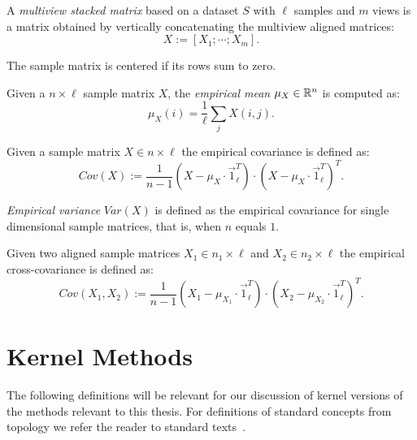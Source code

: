 \begin{definition}\label{def:notation:multiview_stacked_matrix}
A \emph{multiview stacked matrix} based on a dataset $S$ with $\ell$ samples and $m$ views is a matrix obtained by
vertically concatenating the multiview aligned matrices:
$$ X := \left[ X_1; \cdots ; X_m \right].$$
\end{definition}

\begin{definition}\label{def:notation:centered_matrix}
The sample matrix is centered if its rows sum to zero.
\end{definition}

\begin{definition}\label{def:notation:empirical_mean}
Given a $n\times\ell$ sample matrix $X$, the \emph{empirical mean} $\mu_X \in \mathbb{R}^n$ is computed as:
$$ \mu_X(i) = \frac{1}{\ell} \sum_j X(i,j).$$
\end{definition}

\begin{definition}\label{def:notation:empirical_covariance}
Given a sample matrix $X \in n \times \ell$
 the empirical covariance is defined as:
$$ Cov(X) := \frac{1}{n-1}(X - \mu_{X} \cdot \vec{1}_\ell^T)\cdot(X - \mu_{X} \cdot \vec{1}_\ell^T)^T.$$
\end{definition}

\begin{definition}\label{def:notation:empirical_variance}
\emph{Empirical variance} $Var(X)$ is defined as the empirical covariance for single dimensional sample matrices, that is, when $n$ equals $1$.
\end{definition}

\begin{definition}\label{def:notation:empirical_cross_covariance}
Given two aligned sample matrices $X_1 \in n_1 \times \ell$ and $X_2 \in n_2 \times \ell$
 the empirical cross-covariance is defined as:
$$ Cov(X_1, X_2) := \frac{1}{n-1}(X_1 - \mu_{X_1} \cdot \vec{1}_\ell^T)\cdot(X_2 - \mu_{X_2} \cdot \vec{1}_\ell^T)^T.$$
\end{definition}


\section{Kernel Methods}
The following definitions will be relevant for our discussion of kernel versions of the methods relevant to this thesis. For definitions
of standard concepts from topology we refer the reader to standard texts~\cite{bourbaki1998general}.

